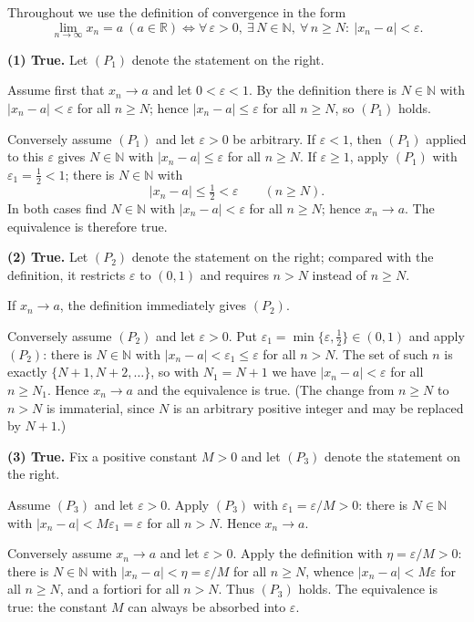 \documentclass[11pt,a4paper]{article}
\newenvironment{solution}[1]{%
  \par\addvspace{1.7ex}%
  \noindent{\color{solutioncolor}\textbf{#1}}\hspace{0.55em}\ignorespaces}%
  {\par\addvspace{0.9ex}}
\begin{document}
\begin{solution}{Solution 2.1.1}\label{xs:2.1.1}
Throughout we use the definition of convergence in the form
\[
  \lim_{n\to\infty}x_n=a\ (a\in\mathbb{R})
  \iff \forall\,\varepsilon>0,\ \exists\,N\in\mathbb{N},\ \forall\,n\ge N:\
  |x_n-a|<\varepsilon .
\]

\medskip
\noindent\textbf{(1) True.}
Let $(P_1)$ denote the statement on the right.

Assume first that $x_n\to a$ and let $0<\varepsilon<1$. By the definition there is
$N\in\mathbb{N}$ with $|x_n-a|<\varepsilon$ for all $n\ge N$; hence
$|x_n-a|\le\varepsilon$ for all $n\ge N$, so $(P_1)$ holds.

Conversely assume $(P_1)$ and let $\varepsilon>0$ be arbitrary. If
$\varepsilon<1$, then $(P_1)$ applied to this $\varepsilon$ gives
$N\in\mathbb{N}$ with $|x_n-a|\le\varepsilon$ for all $n\ge N$. If
$\varepsilon\ge1$, apply $(P_1)$ with $\varepsilon_1=\tfrac12<1$; there is
$N\in\mathbb{N}$ with
\[
  |x_n-a|\le\tfrac12<\varepsilon\qquad(n\ge N).
\]
In both cases find $N\in\mathbb{N}$ with $|x_n-a|<\varepsilon$ for all $n\ge N$;
hence $x_n\to a$. The equivalence is therefore true.

\medskip
\noindent\textbf{(2) True.}
Let $(P_2)$ denote the statement on the right; compared with the definition, it
restricts $\varepsilon$ to $(0,1)$ and requires $n>N$ instead of $n\ge N$.

If $x_n\to a$, the definition immediately gives $(P_2)$.

Conversely assume $(P_2)$ and let $\varepsilon>0$. Put
$\varepsilon_1=\min\{\varepsilon,\tfrac12\}\in(0,1)$ and apply $(P_2)$: there is
$N\in\mathbb{N}$ with $|x_n-a|<\varepsilon_1\le\varepsilon$ for all $n>N$. The
set of such $n$ is exactly $\{N+1,N+2,\dots\}$, so with $N_1=N+1$ we have
$|x_n-a|<\varepsilon$ for all $n\ge N_1$. Hence $x_n\to a$ and the equivalence is
true. (The change from $n\ge N$ to $n>N$ is immaterial, since $N$ is an arbitrary
positive integer and may be replaced by $N+1$.)

\medskip
\noindent\textbf{(3) True.}
Fix a positive constant $M>0$ and let $(P_3)$ denote the statement on the right.

Assume $(P_3)$ and let $\varepsilon>0$. Apply $(P_3)$ with
$\varepsilon_1=\varepsilon/M>0$: there is $N\in\mathbb{N}$ with
$|x_n-a|<M\varepsilon_1=\varepsilon$ for all $n>N$. Hence $x_n\to a$.

Conversely assume $x_n\to a$ and let $\varepsilon>0$. Apply the definition with
$\eta=\varepsilon/M>0$: there is $N\in\mathbb{N}$ with
$|x_n-a|<\eta=\varepsilon/M$ for all $n\ge N$, whence
$|x_n-a|<M\varepsilon$ for all $n\ge N$, and a fortiori for all $n>N$. Thus
$(P_3)$ holds. The equivalence is true: the constant $M$ can always be absorbed
into $\varepsilon$.


\end{solution}
\end{document}
